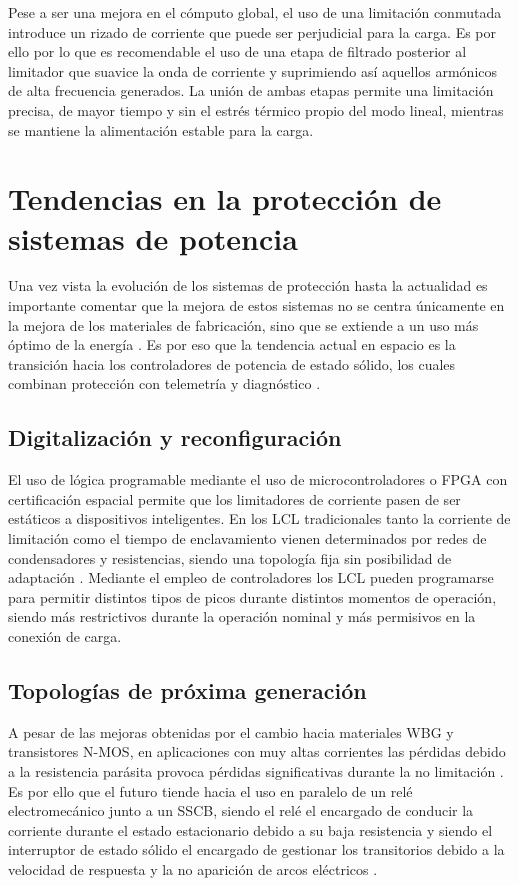 \documentclass[12pt]{report} %
\begin{document}
Pese a ser una mejora en el cómputo global, el uso de una limitación conmutada introduce un rizado de corriente que puede ser perjudicial para la carga. Es por ello por lo que es recomendable el uso de una etapa de filtrado posterior al limitador que suavice la onda de corriente y suprimiendo así aquellos armónicos de alta frecuencia generados. La unión de ambas etapas permite una limitación precisa, de mayor tiempo y sin el estrés térmico propio del modo lineal, mientras se mantiene la alimentación estable para la carga. 

\section{Tendencias en la protección de sistemas de potencia}
Una vez vista la evolución de los sistemas de protección hasta la actualidad es importante comentar que la mejora de estos sistemas no se centra únicamente en la mejora de los materiales de fabricación, sino que se extiende a un uso más óptimo de la energía \cite{adrian_garcia_hidalgo_diseno_nodate}. Es por eso que la tendencia actual en espacio es la transición hacia los controladores de potencia de estado sólido, los cuales combinan protección con telemetría y diagnóstico \cite{noauthor_comprension_nodate}. 
\subsection{Digitalización y reconfiguración}
\label{subsec:digit_reconfig}
El uso de lógica programable mediante el uso de microcontroladores o FPGA con certificación espacial permite que los limitadores de corriente pasen de ser estáticos a dispositivos inteligentes\cite{noauthor_comprension_nodate}. En los LCL tradicionales tanto la corriente de limitación como el tiempo de enclavamiento vienen determinados por redes de condensadores y resistencias, siendo una topología fija sin posibilidad de adaptación \cite{noauthor_proteccion_nodate}. Mediante el empleo de controladores los LCL pueden programarse para permitir distintos tipos de picos durante distintos momentos de operación, siendo más restrictivos durante la operación nominal y más permisivos en la conexión de carga. 
\subsection{Topologías de próxima generación}
A pesar de las mejoras obtenidas por el cambio hacia materiales WBG y transistores N-MOS, en aplicaciones con muy altas corrientes las pérdidas debido a la resistencia parásita provoca pérdidas significativas durante la no limitación \cite{noauthor_proteccion_nodate}. Es por ello que el futuro tiende hacia el uso en paralelo de un relé electromecánico junto a un SSCB, siendo el relé el encargado de conducir la corriente durante el estado estacionario debido a su baja resistencia y siendo el interruptor de estado sólido el encargado de gestionar los transitorios debido a la velocidad de respuesta y la no aparición de arcos eléctricos \cite{adrian_garcia_hidalgo_diseno_nodate}. 
\end{document}
